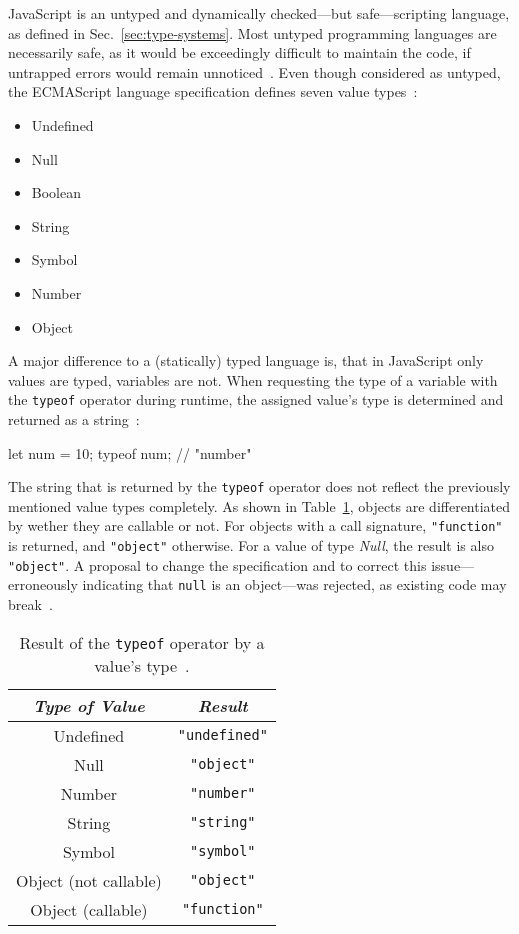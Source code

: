 JavaScript is an untyped and dynamically checked---but safe---scripting language, as defined in Sec.~\ref{sec:type-systems}. Most untyped programming languages are necessarily safe, as it would be exceedingly difficult to maintain the code, if untrapped errors would remain unnoticed~\cite[p.~4]{TypeSystems:Cardelli:2004}. Even though considered as untyped, the ECMAScript language specification defines seven value types~\cite[p.~16]{ES6Spec:Ecma:2015}:
\begin{itemize}
  \item Undefined
  \item Null
  \item Boolean
  \item String
  \item Symbol
  \item Number
  \item Object
\end{itemize}
A major difference to a (statically) typed language is, that in JavaScript only values are typed, variables are not. When requesting the type of a variable with the \texttt{typeof} operator during runtime, the assigned value's type is determined and returned as a string~\cite[p.~30]{YDKJS:UpAndGoing:Simpson:2015}:
\begin{JsCode}[numbers=none]
let num = 10;
typeof num; // "number"
\end{JsCode}
The string that is returned by the \texttt{typeof} operator does not reflect the previously mentioned value types completely. As shown in Table~\ref{tab:typeof}, objects are differentiated by wether they are callable or not. For objects with a call signature, \texttt{"function"} is returned, and \texttt{"object"} otherwise. For a value of type \emph{Null}, the result is also \texttt{"object"}. A proposal to change the specification and to correct this issue---erroneously indicating that \texttt{null} is an object---was rejected, as existing code may break~\cite{TypeofNull:Smith:2013, typeof:MDN:2017}.

\begin{table}
\caption{Result of the \texttt{typeof} operator by a value's type~\cite[p.~164]{ES6Spec:Ecma:2015}.}
\label{tab:typeof}
\centering
  \setlength{\tabcolsep}{5mm}
  \def\arraystretch{1.25}
  \small
  \begin{tabular}{|c|c|}
    \hline
    \emph{Type of Value} & \emph{Result} \\
    \hline \hline
    Undefined & \texttt{"undefined"} \\
    \hline
    Null & \texttt{"object"} \\
    \hline
    Number & \texttt{"number"} \\
    \hline
    String & \texttt{"string"} \\
    \hline
    Symbol & \texttt{"symbol"} \\
    \hline
    Object (not callable) & \texttt{"object"} \\
    \hline
    Object (callable) & \texttt{"function"} \\
    \hline
  \end{tabular}
\end{table}

